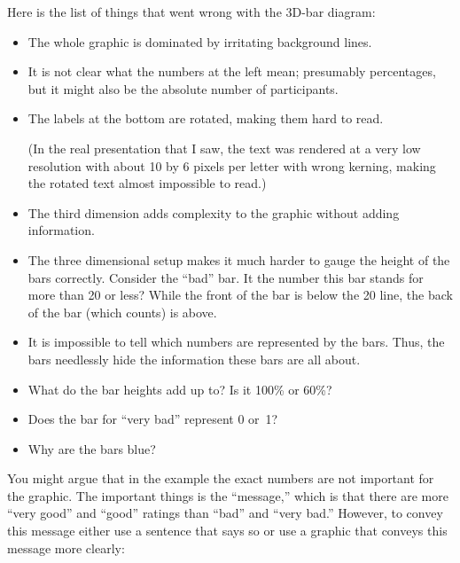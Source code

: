 Here is the list of things that went wrong with the 3D-bar diagram:
\begin{itemize}
\item
  The whole graphic is dominated by irritating background lines.
\item
  It is not clear what the numbers at the left mean; presumably
  percentages, but it might also be the absolute number of
  participants.
\item
  The labels at the bottom are rotated, making them hard to read.

  (In the real presentation that I saw, the text was rendered at a very 
  low resolution with about 10 by 6 pixels per letter with wrong
  kerning, making the rotated text almost impossible to read.)
\item
  The third dimension adds complexity to the graphic without adding
  information.
\item
  The three dimensional setup makes it much harder to gauge the height
  of the bars correctly. Consider the ``bad'' bar. It the number this
  bar stands for more than 20 or less? While the front of the bar is
  below the 20 line, the back of the bar (which counts) is above.
\item
  It is impossible to tell which  numbers are represented by the
  bars. Thus, the bars needlessly hide the information these bars are
  all about.
\item
  What do the bar heights add up to? Is it 100\% or 60\%?
\item
  Does the bar for ``very bad'' represent 0 or~1?
\item
  Why are the bars blue?
\end{itemize}

You might argue that in the example the exact numbers are not
important for the graphic. The important things is the ``message,''
which is that there are more ``very good'' and ``good'' ratings than
``bad'' and ``very bad.'' However, to convey this message either use a
sentence that says so or use a graphic that conveys this message more
clearly:  

